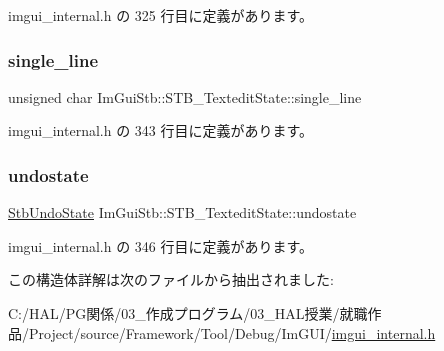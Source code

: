  imgui\+\_\+internal.\+h の 325 行目に定義があります。

\mbox{\label{struct_im_gui_stb_1_1_s_t_b___textedit_state_aa3bde2b0354fbdc2413dbc9a8aaef9c7}} 
\subsubsection{\texorpdfstring{single\+\_\+line}{single\_line}}
{\footnotesize\ttfamily unsigned char Im\+Gui\+Stb\+::\+S\+T\+B\+\_\+\+Textedit\+State\+::single\+\_\+line}



 imgui\+\_\+internal.\+h の 343 行目に定義があります。

\mbox{\label{struct_im_gui_stb_1_1_s_t_b___textedit_state_aa53b0d0fcbe15632d67f42bc37e6888d}} 
\subsubsection{\texorpdfstring{undostate}{undostate}}
{\footnotesize\ttfamily \mbox{\hyperlink{struct_im_gui_stb_1_1_stb_undo_state}{Stb\+Undo\+State}} Im\+Gui\+Stb\+::\+S\+T\+B\+\_\+\+Textedit\+State\+::undostate}



 imgui\+\_\+internal.\+h の 346 行目に定義があります。



この構造体詳解は次のファイルから抽出されました\+:\begin{DoxyCompactItemize}
\item 
C\+:/\+H\+A\+L/\+P\+G関係/03\+\_\+作成プログラム/03\+\_\+\+H\+A\+L授業/就職作品/\+Project/source/\+Framework/\+Tool/\+Debug/\+Im\+G\+U\+I/\mbox{\hyperlink{imgui__internal_8h}{imgui\+\_\+internal.\+h}}\end{DoxyCompactItemize}
